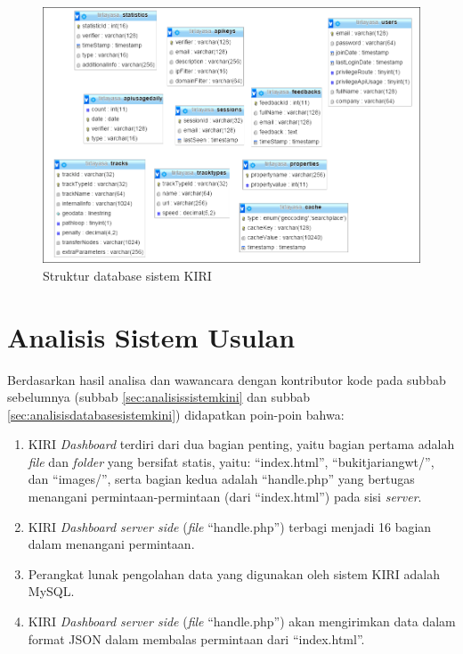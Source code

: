 \begin{figure}[htbp]
	\centering
		\includegraphics[scale=0.7]{Gambar/4_strukturdatabase.PNG}
	\caption{Struktur database sistem KIRI}
	\label{fig:4_strukturdatabase}
\end{figure}


\section{Analisis Sistem Usulan}
\label{sec:analisissistemusulan}
Berdasarkan hasil analisa dan wawancara dengan kontributor kode pada subbab sebelumnya (subbab \ref{sec:analisissistemkini} dan subbab \ref{sec:analisisdatabasesistemkini}) didapatkan poin-poin bahwa:
\begin{enumerate}
	\item KIRI \textit{Dashboard} terdiri dari dua bagian penting, yaitu bagian pertama adalah \textit{file} dan \textit{folder} yang bersifat statis, yaitu: ``index.html'', ``bukitjariangwt/'', dan ``images/'', serta bagian kedua adalah ``handle.php'' yang bertugas menangani permintaan-permintaan (dari ``index.html'') pada sisi \textit{server}.
	\item KIRI \textit{Dashboard server side} (\textit{file} ``handle.php'') terbagi menjadi 16 bagian dalam menangani permintaan.
	\item Perangkat lunak pengolahan data yang digunakan oleh sistem KIRI adalah MySQL.
	\item KIRI \textit{Dashboard server side} (\textit{file} ``handle.php'') akan mengirimkan data dalam format JSON dalam membalas permintaan dari ``index.html''.
\end{enumerate}

